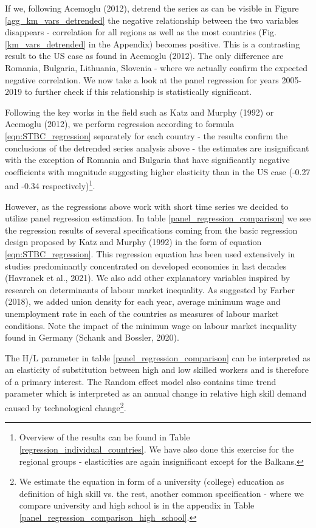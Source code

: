 \documentclass{article}
\begin{document}
If we, following Acemoglu (2012), detrend the series as can be visible in Figure \ref{agg_km_vars_detrended} the negative relationship between the two variables disappears - correlation for all regions as well as the most countries (Fig. \ref{km_vars_detrended} in the Appendix) becomes positive. This is a contrasting result to the US case as found in Acemoglu (2012). The only difference are Romania, Bulgaria, Lithuania, Slovenia - where we actually confirm the expected negative correlation.
We now take a look at the panel regression for years 2005-2019 to further check if this relationship is statistically significant.

Following the key works in the field such as Katz and Murphy (1992) or Acemoglu (2012), we perform regression according to formula \ref{eqn:STBC_regression} separately for each country - the results confirm the conclusions of the detrended series analysis above - the estimates are insignificant with the exception of Romania and Bulgaria that have significantly negative coefficients with magnitude suggesting higher elasticity than in the US case (-0.27 and -0.34 respectively)\footnote{Overview of the results can be found in Table \ref{regression_individual_countries}. We have also done this exercise for the regional groups - elasticities are again insignificant except for the Balkans.}.

However, as the regressions above work with short time series we decided to utilize panel regression estimation. In table \ref{panel_regression_comparison} we see the regression results of several specifications coming from the basic regression design proposed by Katz and Murphy (1992) in the form of equation \ref{eqn:STBC_regression}. This regression equation has been used extensively in studies predominantly concentrated on developed economies in last decades (Havranek et al., 2021). We also add other explanatory variables inspired by research on determinants of labour market inequality. As suggested by Farber (2018), we added union density for each year, average minimum wage and unemployment rate in each of the countries as measures of labour market conditions. Note the impact of the minimun wage on labour market inequality found in Germany (Schank and Bossler, 2020).

The H/L parameter in table \ref{panel_regression_comparison} can be interpreted as an elasticity of substitution between high and low skilled workers and is therefore of a primary interest. The Random effect model also contains time trend parameter which is interpreted as an annual change in relative high skill demand caused by technological change\footnote{We estimate the equation in form of a university (college) education as definition of high skill vs. the rest, another common specification - where we compare university and high school is in the appendix in Table \ref{panel_regression_comparison_high_school}.}.
\end{document}
